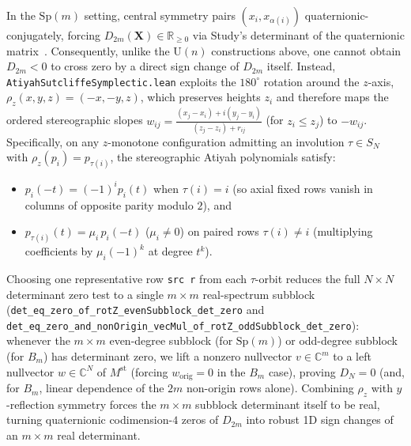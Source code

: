 \documentclass[11pt,reqno]{amsart}
\theoremstyle{remark}
\newcommand{\R}{\mathbb{R}}
\newcommand{\C}{\mathbb{C}}
\begin{document}
In the $\mathrm{Sp}(m)$ setting, central symmetry pairs $(x_i, x_{\alpha(i)})$ quaternionic-conjugately, forcing $D_{2m}(\mathbf{X}) \in \R_{\ge 0}$ via Study's determinant of the quaternionic matrix~\cite{Malkoun2014}.
Consequently, unlike the $\mathrm{U}(n)$ constructions above, one cannot obtain $D_{2m} < 0$ to cross zero by a direct sign change of $D_{2m}$ itself.
Instead, \texttt{AtiyahSutcliffeSymplectic.lean} exploits the $180^\circ$ rotation around the $z$-axis, $\rho_z(x, y, z) = (-x, -y, z)$, which preserves heights $z_i$ and therefore maps the ordered stereographic slopes $w_{ij} = \frac{(x_j - x_i) + i(y_j - y_i)}{(z_j - z_i) + r_{ij}}$ (for $z_i \le z_j$) to $-w_{ij}$.
Specifically, on any $z$-monotone configuration admitting an involution $\tau \in S_N$ with $\rho_z(p_i) = p_{\tau(i)}$, the stereographic Atiyah polynomials satisfy:
\begin{itemize}
  \item $p_i(-t) = (-1)^i p_i(t)$ when $\tau(i) = i$ (so axial fixed rows vanish in columns of opposite parity modulo $2$), and
  \item $p_{\tau(i)}(t) = \mu_i\, p_i(-t)$ ($\mu_i \ne 0$) on paired rows $\tau(i) \ne i$ (multiplying coefficients by $\mu_i (-1)^k$ at degree $t^k$).
\end{itemize}
Choosing one representative row \texttt{src r} from each $\tau$-orbit reduces the full $N \times N$ determinant zero test to a single $m \times m$ real-spectrum subblock (\texttt{det\_eq\_zero\_of\_rotZ\_evenSubblock\_det\_zero} and \texttt{det\_eq\_zero\_and\_nonOrigin\_vecMul\_of\_rotZ\_oddSubblock\_det\_zero}): whenever the $m \times m$ even-degree subblock (for $\mathrm{Sp}(m)$) or odd-degree subblock (for $B_m$) has determinant zero, we lift a nonzero nullvector $v \in \C^m$ to a left nullvector $w \in \C^N$ of $M^{\mathrm{st}}$ (forcing $w_{\mathrm{orig}} = 0$ in the $B_m$ case), proving $D_N = 0$ (and, for $B_m$, linear dependence of the $2m$ non-origin rows alone).
Combining $\rho_z$ with $y$-reflection symmetry forces the $m \times m$ subblock determinant itself to be real, turning quaternionic codimension-$4$ zeros of $D_{2m}$ into robust 1D sign changes of an $m \times m$ real determinant.
\end{document}
